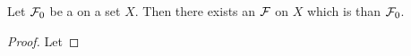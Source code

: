\begin{prop}
\label{prop:ExistenceOfFinerUltrafilter}
    Let $\mathcal{F}_0$ be a \Filter on a set $X$. 
    Then there exists an \UltraFilter $\mathcal{F}$ on $X$ 
    which is \FinerFilter than $\mathcal{F}_0$. 
    \begin{proof}
        Let 
    \end{proof}
\end{prop}
